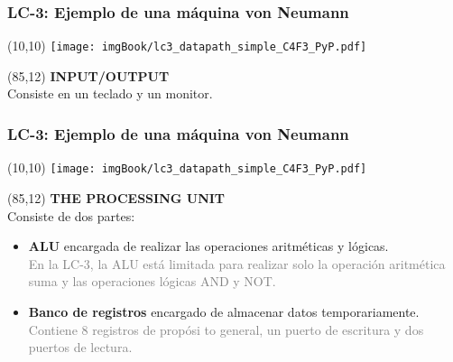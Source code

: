 \documentclass[aspectratio=169]{beamer}
\begin{document}
\begin{frame}[t,fragile]
    \frametitle{LC-3: Ejemplo de una máquina von Neumann}
    \begin{textblock}{70}(10,10)
    \texttt{[image: imgBook/lc3\_datapath\_simple\_C4F3\_PyP.pdf]}
    \end{textblock}
    \begin{textblock}{60}(85,12)
    \textbf{INPUT/OUTPUT}\\
    \small
    Consiste en un teclado y un monitor.\\
    \end{textblock}
\end{frame}

\begin{frame}[t,fragile]
    \frametitle{LC-3: Ejemplo de una máquina von Neumann}
    \begin{textblock}{70}(10,10)
    \texttt{[image: imgBook/lc3\_datapath\_simple\_C4F3\_PyP.pdf]}
    \end{textblock}
    \begin{textblock}{60}(85,12)
    \textbf{THE PROCESSING UNIT}\\
    \small
    \bigskip
    Consiste de dos partes:
    \begin{itemize}
     \item<2-> \textbf{ALU} encargada de realizar las operaciones aritméticas y lógicas.\\
    \textcolor{gray}{En la LC-3, la ALU está limitada para realizar solo la operación aritmética suma y las operaciones lógicas AND y NOT.}
     \item<3-> \textbf{Banco de registros} encargado de almacenar datos temporariamente.\\
    \textcolor{gray}{Contiene 8 registros de propósi to general, un puerto de escritura y dos puertos de lectura.}\\
    \end{itemize}
    \end{textblock}
\end{frame}
\end{document}
